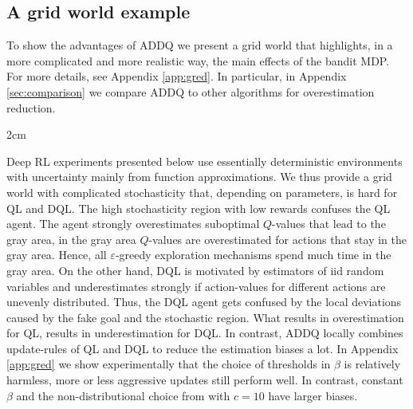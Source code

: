 \documentclass{article}
\theoremstyle{plain}
\theoremstyle{definition}
\theoremstyle{remark}
\begin{document}
\subsection{A grid world example}
To show the advantages of ADDQ we present a grid world that highlights, in a more complicated and more realistic way, the main effects of the bandit MDP. For more details, see Appendix \ref{app:gred}. In particular, in Appendix \ref{sec:comparison} we compare ADDQ to other algorithms for overestimation reduction.
\begin{floatingfigure}[r]{2cm}\label{gridword}
\vspace{-3mm}
\begin{center}
\end{center}
\vspace{-3mm}
\caption{Start in S, goal in G, fake goal in F, high stochasticity and low reward area in gray}
\end{floatingfigure}
Deep RL experiments presented below use essentially  deterministic environments with uncertainty mainly from function approximations. We thus provide a grid world with complicated stochasticity that, depending on parameters, is hard for QL and DQL. The high stochasticity region with low rewards confuses the QL agent. The agent strongly overestimates suboptimal $Q$-values that lead to the gray area, in the gray area $Q$-values are overestimated for actions that stay in the gray area. Hence, all $\varepsilon$-greedy exploration mechanisms spend much time in the gray area. On the other hand, DQL is motivated by estimators of iid random variables and underestimates strongly if action-values for different actions are unevenly distributed. Thus, the DQL agent gets  confused by the local deviations caused by the fake goal and the stochastic region. What results in overestimation for QL, results in underestimation for DQL. In contrast, ADDQ locally combines update-rules of QL and DQL to reduce the estimation biases a lot. In Appendix \ref{app:gred} we show experimentally that the choice of thresholds in $\beta$ is relatively harmless, more or less  aggressive updates still perform well. In contrast, constant $\beta$ and the non-distributional choice from \cite{weightedDoubleQ} with $c=10$ have larger biases.
\end{document}

